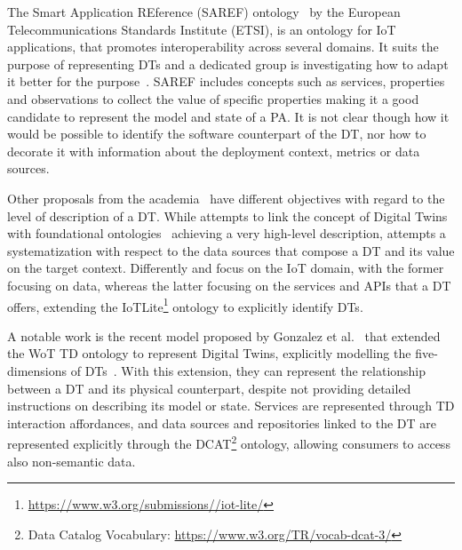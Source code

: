 The Smart Application REference (SAREF) ontology~\cite{saref} by the European Telecommunications Standards Institute (ETSI), is an ontology for IoT applications, that promotes interoperability across several domains. It suits the purpose of representing DTs and a dedicated group is investigating how to adapt it better for the purpose~\cite{etsi_dt_comm_requirements}. SAREF includes concepts such as services, properties and observations to collect the value of specific properties making it a good candidate to represent the model and state of a PA. It is not clear though how it would be possible to identify the software counterpart of the DT, nor how to decorate it with information about the deployment context, metrics or data sources.

Other proposals from the academia~\cite{barth_systematization_2020, barros2021requirements, singh_data_2021, steinmetz_internet_2018} have different objectives with regard to the level of description of a DT. While \cite{barros2021requirements} attempts to link the concept of Digital Twins with foundational ontologies~\cite{guizzardi2022ao} achieving a very high-level description, \cite{barth_systematization_2020} attempts a systematization with respect to the data sources that compose a DT and its value on the target context. Differently \cite{singh_data_2021} and \cite{steinmetz_internet_2018} focus on the IoT domain, with the former focusing on data, whereas the latter focusing on the services and APIs that a DT offers, extending the IoTLite\footnote{\url{https://www.w3.org/submissions//iot-lite/}} ontology to explicitly identify DTs.

A notable work is the recent model proposed by Gonzalez et al.~\cite{gonzalez-gerpe_wotdt_nodate} that extended the WoT TD ontology to represent Digital Twins, explicitly modelling the five-dimensions of DTs~\cite{QI20213}.
With this extension, they can represent the relationship between a DT and its physical counterpart, despite not providing detailed instructions on describing its model or state. Services are represented through TD interaction affordances, and data sources and repositories linked to the DT are represented explicitly through the DCAT\footnote{Data Catalog Vocabulary: \url{https://www.w3.org/TR/vocab-dcat-3/}} ontology, allowing consumers to access also non-semantic data.


